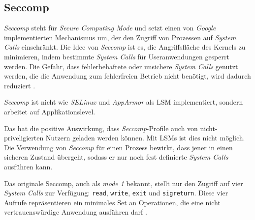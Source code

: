 \documentclass[../main.tex]{subfiles}
\begin{document}

    \subsection{Seccomp}

			\emph{Seccomp} steht für \emph{Secure Computing Mode} und setzt einen von \emph{Google} implementierten Mechanismus um, der den Zugriff von Prozessen auf \emph{System Calls} einschränkt. Die Idee von \emph{Seccomp} ist es, die Angriffsfläche des Kernels zu minimieren, indem bestimmte \emph{System Calls} für Useranwendungen gesperrt werden. Die Gefahr, dass fehlerbehaftete oder unsichere \emph{System Calls} genutzt werden, die die Anwendung zum fehlerfreien Betrieb nicht benötigt, wird dadurch reduziert \cite{linuxSecOverview}\cite{seccompGitDesc}\cite{secInFuture}.

			\emph{Seccomp} ist nicht wie \emph{SELinux} und \emph{AppArmor} als LSM implementiert, sondern arbeitet auf Applikationslevel.

			Das hat die positive Auswirkung, dass \emph{Seccomp}-Profile auch von nicht-priveligierten Nutzern geladen werden können. Mit LSMs ist dies nicht möglich.
			Die Verwendung von \emph{Seccomp} für einen Prozess bewirkt, dass jener in einen \glqq{}sicheren\grqq{} Zustand übergeht, sodass er nur noch fest definierte \emph{System Calls} ausführen kann.



			Das originale Seccomp, auch als \emph{mode 1} bekannt, stellt nur den Zugriff auf vier \emph{System Calls} zur Verfügung: \texttt{read}, \texttt{write}, \texttt{exit} und \texttt{sigreturn}. Diese vier Aufrufe repräsentieren ein minimales Set an Operationen, die eine nicht vertrauenswürdige Anwendung ausführen darf \cite{linuxSecOverview}.
\end{document}

